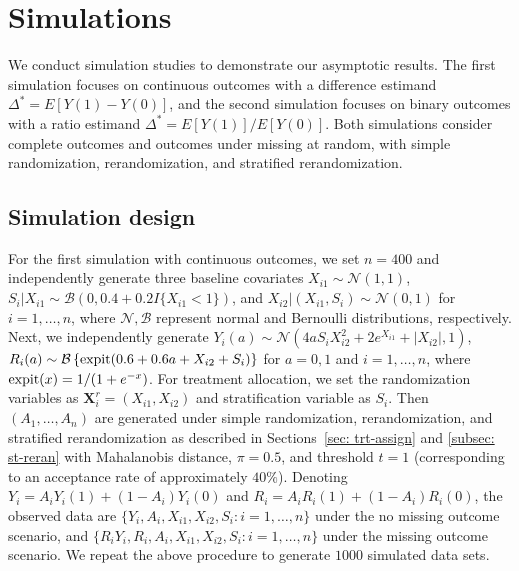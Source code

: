 \documentclass[12pt]{article}
\newcommand{\bX}{\boldsymbol{X}}\newcommand{\bO}{\boldsymbol{O}}
\begin{document}
{\section{Simulations}\label{sec:sim}
We conduct simulation studies to demonstrate our asymptotic results. The first simulation focuses on continuous outcomes with a difference estimand $\Delta^*=E[Y(1)-Y(0)]$, and the second simulation focuses on binary outcomes with a ratio estimand $\Delta^*=E[Y(1)]/E[Y(0)]$. Both simulations consider complete outcomes and outcomes under missing at random, with simple randomization, rerandomization, and stratified rerandomization. 

\subsection{Simulation design}
For the first simulation with continuous outcomes, we set $n=400$ and independently generate three baseline covariates $X_{i1} \sim \mathcal{N}(1,1)$, $S_i|X_{i1} \sim \mathcal{B}(0, 0.4 + 0.2 I\{X_{i1}<1\})$, and $X_{i2}|(X_{i1},S_i) \sim \mathcal{N}(0,1)$ for $i=1,\dots, n$, where $\mathcal{N}, \mathcal{B}$ represent normal and Bernoulli distributions, respectively. Next, we independently generate $Y_i(a) \sim \mathcal{N}\left(4aS_iX_{i2}^2 + 2 e^{X_{i1}} + |X_{i2}|, 1\right)$, $R_i(a) \sim \mathcal{B}\left\{\textup{expit}(0.6 + 0.6a + X_{i2} + S_i)\right\}$ 
for $a = 0,1$ and $i =1,\dots, n$, where $\textup{expit}(x) = 1/(1+e^{-x})$. For treatment allocation, we set the randomization variables as $\bX^r_i = (X_{i1},X_{i2})$ and stratification variable as $S_i$. Then $(A_1,\dots, A_n)$ are generated under simple randomization, rerandomization, and stratified rerandomization as described in Sections~\ref{sec: trt-assign} and \ref{subsec: st-reran} with Mahalanobis distance, $\pi=0.5$, and threshold $t=1$ (corresponding to an acceptance rate of approximately $40\%$). Denoting $Y_i = A_iY_i(1) + (1-A_i)Y_i(0)$ and $R_i = A_iR_i(1) + (1-A_i)R_i(0)$, the observed data are $\{Y_i, A_i, X_{i1},X_{i2}, S_i:i=1,\dots, n\}$ under the no missing outcome scenario, and $\{R_iY_i, R_i, A_i, X_{i1},X_{i2}, S_i:i=1,\dots, n\}$ under the missing outcome scenario. We repeat the above procedure to generate $1000$ simulated data sets.

}
\end{document}
